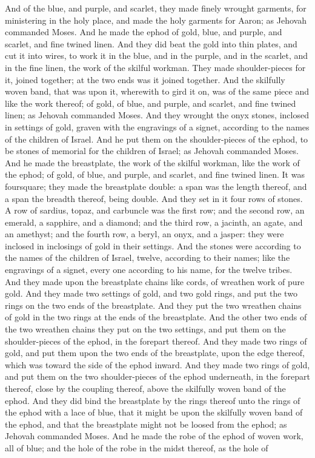 And of the blue, and purple, and scarlet, they made finely wrought garments, for ministering in the holy place, and made the holy garments for Aaron; as Jehovah commanded Moses.  And he made the ephod of gold, blue, and purple, and scarlet, and fine twined linen. And they did beat the gold into thin plates, and cut it into wires, to work it in the blue, and in the purple, and in the scarlet, and in the fine linen, the work of the skilful workman. They made shoulder-pieces for it, joined together; at the two ends was it joined together. And the skilfully woven band, that was upon it, wherewith to gird it on, was of the same piece and like the work thereof; of gold, of blue, and purple, and scarlet, and fine twined linen; as Jehovah commanded Moses.  And they wrought the onyx stones, inclosed in settings of gold, graven with the engravings of a signet, according to the names of the children of Israel. And he put them on the shoulder-pieces of the ephod, to be stones of memorial for the children of Israel; as Jehovah commanded Moses.  And he made the breastplate, the work of the skilful workman, like the work of the ephod; of gold, of blue, and purple, and scarlet, and fine twined linen. It was foursquare; they made the breastplate double: a span was the length thereof, and a span the breadth thereof, being double. And they set in it four rows of stones. A row of sardius, topaz, and carbuncle was the first row; and the second row, an emerald, a sapphire, and a diamond; and the third row, a jacinth, an agate, and an amethyst; and the fourth row, a beryl, an onyx, and a jasper: they were inclosed in inclosings of gold in their settings. And the stones were according to the names of the children of Israel, twelve, according to their names; like the engravings of a signet, every one according to his name, for the twelve tribes. And they made upon the breastplate chains like cords, of wreathen work of pure gold. And they made two settings of gold, and two gold rings, and put the two rings on the two ends of the breastplate. And they put the two wreathen chains of gold in the two rings at the ends of the breastplate. And the other two ends of the two wreathen chains they put on the two settings, and put them on the shoulder-pieces of the ephod, in the forepart thereof. And they made two rings of gold, and put them upon the two ends of the breastplate, upon the edge thereof, which was toward the side of the ephod inward. And they made two rings of gold, and put them on the two shoulder-pieces of the ephod underneath, in the forepart thereof, close by the coupling thereof, above the skilfully woven band of the ephod. And they did bind the breastplate by the rings thereof unto the rings of the ephod with a lace of blue, that it might be upon the skilfully woven band of the ephod, and that the breastplate might not be loosed from the ephod; as Jehovah commanded Moses.  And he made the robe of the ephod of woven work, all of blue; and the hole of the robe in the midst thereof, as the hole of 